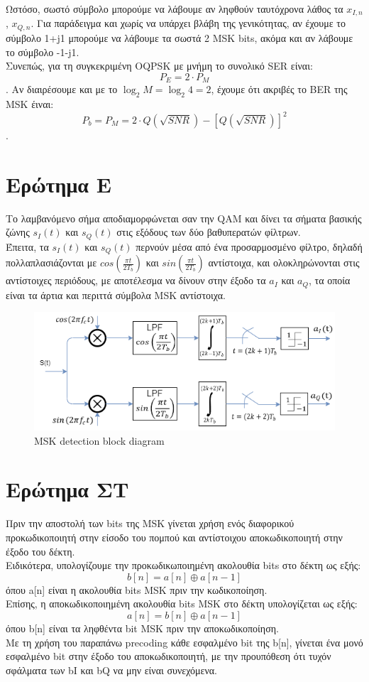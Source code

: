 \documentclass{article}
\begin{document}
\noindent
Ωστόσο, σωστό σύμβολο μπορούμε να λάβουμε αν ληφθούν ταυτόχρονα λάθος τα $x_{I,n}$, $x_{Q,n}$. Για παράδειγμα και χωρίς να υπάρχει βλάβη της γενικότητας, αν έχουμε το σύμβολο 1+j1 μπορούμε να λάβουμε τα σωστά 2 MSK bits, ακόμα και αν λάβουμε το σύμβολο -1-j1.\\
Συνεπώς, για τη συγκεκριμένη OQPSK με μνήμη το συνολικό SER είναι:
$$P_{E}= 2 \cdot P_{M}$$.
Aν διαιρέσουμε και με το $\log_2 M = \log_2 4 = 2$, έχουμε ότι ακριβές το BER της MSK έιναι:
$$P_{b}= P_{M} = 2 \cdot  Q(\sqrt{SNR}) - [Q(\sqrt{SNR})]^2$$.
\section{Eρώτημα Ε}
Το λαμβανόμενο σήμα αποδιαμορφώνεται σαν την QAM και δίνει τα σήματα βασικής ζώνης $s_{I}(t)$ και $s_{Q}(t)$ στις εξόδους των δύο βαθυπερατών φίλτρων. \\
Έπειτα, τα $s_{I}(t)$ και $s_{Q}(t)$ περνούν μέσα από ένα προσαρμοσμένο φίλτρο, δηλαδή πολλαπλασιάζονται με $cos\left(\frac{πt}{2T_{b}}\right)$ και $sin\left(\frac{πt}{2T_{b}}\right)$ αντίστοιχα, και ολοκληρώνονται στις αντίστοιχες περιόδους, με αποτέλεσμα να δίνουν στην έξοδο τα $a_{Ι}$  και $a_{Q}$, τα οποία είναι τα άρτια και περιττά σύμβολα MSK αντίστοιχα.


\begin{figure}[h]
	\centering
	\includegraphics[width=0.8\linewidth]{./results/MSK_detector.png}
	\caption{MSK detection block diagram}
\end{figure}
\section{Eρώτημα ΣΤ}
Πριν την αποστολή των bits της MSK γίνεται χρήση ενός διαφορικού προκωδικοποιητή  στην είσοδο του πομπού και αντίστοιχου αποκωδικοποιητή στην έξοδο του δέκτη.\\ Ειδικότερα, υπολογίζουμε την προκωδικωποιημένη ακολουθία bits στο δέκτη ως εξής:
$$b[n] = a[n] \oplus a[n-1]$$
όπου a[n] είναι η ακολουθία bits MSK πριν την κωδικοποίηση.\\
Επίσης, η αποκωδικοποιημένη ακολουθία bits MSK στο δέκτη υπολογίζεται ως εξής:
$$a[n] = b[n] \oplus a[n-1]$$
όπου b[n] είναι τα ληφθέντα bit MSK πριν την αποκωδικοποίηση.\\
Με τη χρήση του παραπάνω precoding  κάθε εσφαλμένο bit της b[n], γίνεται ένα μονό εσφαλμένο bit στην έξοδο του αποκωδικοποιητή, με την προυπόθεση ότι τυχόν σφάλματα των bI και bQ να μην είναι συνεχόμενα. 
\end{document}
